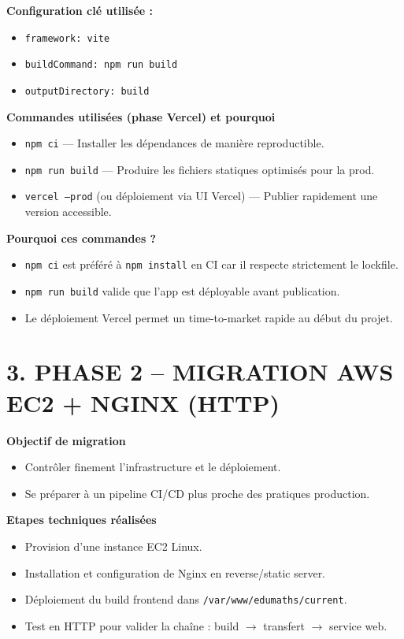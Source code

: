 \documentclass[10pt,a4paper]{article}
\begin{document}
\textbf{Configuration cl\'e utilis\'ee :}
\begin{itemize}
  \item \texttt{framework: vite}
  \item \texttt{buildCommand: npm run build}
  \item \texttt{outputDirectory: build}
\end{itemize}

\textbf{Commandes utilis\'ees (phase Vercel) et pourquoi}
\begin{itemize}
  \item \texttt{npm ci} --- Installer les d\'ependances de mani\`ere reproductible.
  \item \texttt{npm run build} --- Produire les fichiers statiques optimis\'es pour la prod.
  \item \texttt{vercel --prod} (ou d\'eploiement via UI Vercel) --- Publier rapidement une version accessible.
\end{itemize}

\textbf{Pourquoi ces commandes ?}
\begin{itemize}
  \item \texttt{npm ci} est pr\'ef\'er\'e \`a \texttt{npm install} en CI car il respecte strictement le lockfile.
  \item \texttt{npm run build} valide que l'app est d\'eployable avant publication.
  \item Le d\'eploiement Vercel permet un time-to-market rapide au d\'ebut du projet.
\end{itemize}

\section{3. PHASE 2 -- MIGRATION AWS EC2 + NGINX (HTTP)}

\textbf{Objectif de migration}
\begin{itemize}
  \item Contr\^oler finement l'infrastructure et le d\'eploiement.
  \item Se pr\'eparer \`a un pipeline CI/CD plus proche des pratiques production.
\end{itemize}

\textbf{Etapes techniques r\'ealis\'ees}
\begin{itemize}
  \item Provision d'une instance EC2 Linux.
  \item Installation et configuration de Nginx en reverse/static server.
  \item D\'eploiement du build frontend dans \texttt{/var/www/edumaths/current}.
  \item Test en HTTP pour valider la cha\^ine : build $\rightarrow$ transfert $\rightarrow$ service web.
\end{itemize}
\end{document}

